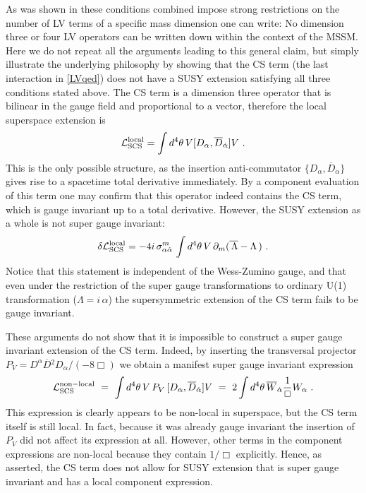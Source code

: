\documentclass[12pt]{revtex4}
\begin{document}
As was shown in \cite{GrootNibbelink:2004za} these conditions 
combined impose strong restrictions on the number of LV terms of
a specific mass dimension one can write: No dimension three or four
LV operators can be written down within the context of the MSSM. 
Here we do not repeat all the arguments leading to this general claim,
but simply illustrate the underlying philosophy by showing that the CS
term (the last interaction in \eqref{LVqed}) does not have a SUSY
extension satisfying all three conditions stated above. The CS term is
a dimension three operator that is bilinear in the gauge field and
proportional to a vector, therefore the local superspace extension is 
\begin{equation}
{\cal L}_{\rm SCS}^{\rm local} = \int d^4 \theta \, 
V [ D_\alpha, \overline{D}_{\dot\alpha}] V~.
\end{equation} 
This is the only possible structure, as the insertion anti-commutator 
$\{D_\alpha, \overline{D}_{\dot\alpha}\}$ gives rise to a spacetime
total derivative immediately. By a component evaluation of this term
one may confirm that this operator indeed contains the CS term, which
is gauge invariant up to a total derivative. However, the
SUSY extension as a whole is not super gauge invariant: 
\begin{equation}
\delta {\cal L}_{\rm SCS}^{\rm local} 
= - 4 i\, \sigma_{\alpha\dot{\alpha}}^m\, 
\int d^4 \theta \, 
V\, \partial_m ( \overline{\, \Lambda} - \Lambda \,)~. 
\end{equation} 
Notice that this statement is independent of the Wess-Zumino
gauge, and that even under the restriction of  the super gauge
transformations to ordinary U(1) transformation 
($\Lambda = i \,\alpha$) the supersymmetric extension of the CS term
fails to be gauge invariant.  


These arguments do not show that it is impossible to construct a super
gauge invariant extension of the CS term. Indeed, by inserting the
transversal projector 
$P_V = D^\alpha \overline{D}{}^2 D_\alpha/(-8 \Box)$
we obtain a manifest super gauge invariant expression 
\begin{equation}
{\cal L}_{\rm SCS}^{\rm non-local} ~=~ \int d^4 \theta \, 
V\, P_V\,  [ D_\alpha, \overline{D}_{\dot\alpha}] V
~=~
2 \int d^4 \theta \, 
\overline{W}_{\dot\alpha} \frac 1{\Box} W_\alpha
~.
\end{equation} 
This expression is clearly appears to be non-local in superspace, but
the CS term itself is still local. In fact, because it was already
gauge invariant the insertion of $P_V$ did not affect its expression
at all. However, other terms in the component expressions are
non-local because they contain $1/\Box$ explicitly. Hence, as
asserted, the CS term does not allow for SUSY extension that is super
gauge invariant and has a local component expression. 
\end{document}
